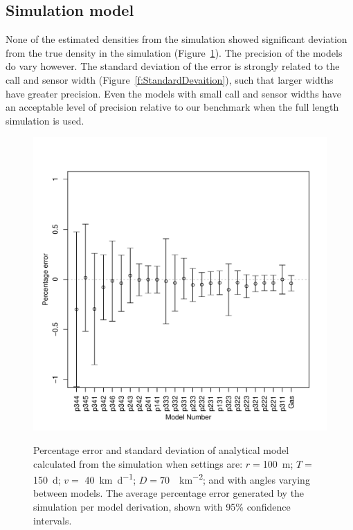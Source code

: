 \documentclass[a4paper,10pt,reqno,oneside]{amsart}
\begin{document}
\subsection{Simulation model}

None of the estimated densities from the simulation showed significant deviation from the true density in the simulation (Figure~\ref{f:ModelBias}). The precision of the models do vary however. The standard deviation of the error is strongly related to the call and sensor width (Figure~\ref{f:StandardDevaition}), such that larger widths have greater precision. Even the models with small call and sensor widths have an acceptable level of precision relative to our benchmark when the full length simulation is used. 

\begin{figure}
	\centering
	\includegraphics[width=1\textwidth]{imgs/AverageModelBias.pdf}
	\label{f:ModelBias}
	\caption{Percentage error and standard deviation of analytical model calculated from the simulation when settings are: $r = $\SI{100}{\meter}; $T = $\SI{150}{\day}; $v = $ \SI{40}{\kilo\meter\per\day}; $D=$\SI{70}{\animals\per\kilo\meter\squared}; and with angles varying between models. The average percentage error generated by the simulation per model derivation, shown with 95\% confidence intervals.}

\end{figure}
\end{document}
